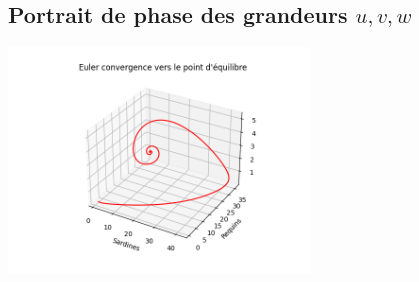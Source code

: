 \documentclass[a4paper, 11pt]{report}%
\begin{document}
        \subsection{Portrait de phase des grandeurs $u,v,w$}
        \begin{center}
            \includegraphics[width=8cm]{figures/convergence_3d_point_equilibre.png}
        \end{center}
        
\end{document}
